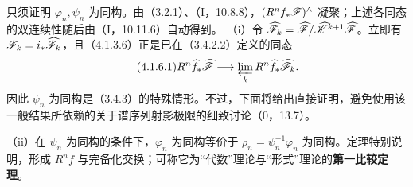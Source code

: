 只须证明 $\varphi_n,\psi_n$ 为同构。由（3.2.1）、（I，10.8.8），$(R^nf_*\mathscr F)^\wedge$ 凝聚；上述各同态的双连续性随后由（I，10.11.6）自动得到。
（i）令 $\widehat{\mathscr F}_k=\widehat{\mathscr F}/\widehat{\mathscr K}^{k+1}\widehat{\mathscr F}$。立即有 $\mathscr F_k=i_*\widehat{\mathscr F}_k$，且（4.1.3.6）正是已在（3.4.2.2）定义的同态
\begin{equation}\tag{4.1.6.1}
R^n\widehat f_*\widehat{\mathscr F}\longrightarrow\varprojlim_kR^n\widehat f_*\widehat{\mathscr F}_k.
\end{equation}
因此 $\psi_n$ 为同构是（3.4.3）的特殊情形。不过，下面将给出直接证明，避免使用该一般结果所依赖的关于谱序列射影极限的细致讨论（0，13.7）。

（ii）在 $\psi_n$ 为同构的条件下，$\varphi_n$ 为同构等价于 $\rho_n=\psi_n^{-1}\varphi_n$ 为同构。定理特别说明，形成 $R^nf$ 与完备化交换；可称它为“代数”理论与“形式”理论的\textbf{第一比较定理}。

